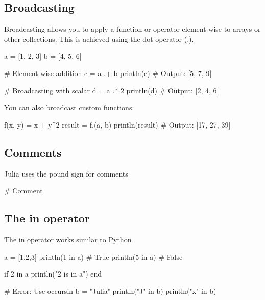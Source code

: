 \documentclass{report}
\begin{document}
    \bigbreak \noindent 
    \subsection{Broadcasting}
    \bigbreak \noindent 
    Broadcasting allows you to apply a function or operator element-wise to arrays or other collections. This is achieved using the dot operator (.).
    \bigbreak \noindent 
    \begin{jlcode}
        a = [1, 2, 3]
        b = [4, 5, 6]

        # Element-wise addition
        c = a .+ b
        println(c)  # Output: [5, 7, 9]

        # Broadcasting with scalar
        d = a .* 2
        println(d)  # Output: [2, 4, 6]
    \end{jlcode}
    \bigbreak \noindent 
    You can also broadcast custom functions:
    \bigbreak \noindent 
    \begin{jlcode}
        f(x, y) = x + y^2
        result = f.(a, b)
        println(result)  # Output: [17, 27, 39]
    \end{jlcode}








    \bigbreak \noindent 
    \subsection{Comments}
    \bigbreak \noindent 
    Julia uses the pound sign for comments
    \bigbreak \noindent 
    \begin{jlcode}
    # Comment
    \end{jlcode}

    \bigbreak \noindent 
    \subsection{The in operator}
    \bigbreak \noindent 
    The in operator works similar to Python
    \bigbreak \noindent 
    \begin{jlcode}
        a = [1,2,3]
        println(1 in a) # True
        println(5 in a) # False

        if 2 in a
            println("2 is in a")
        end

        # Error: Use occursin
        b = "Julia"
        println("J" in b)
        println("x" in b)
    \end{jlcode}
\end{document}
